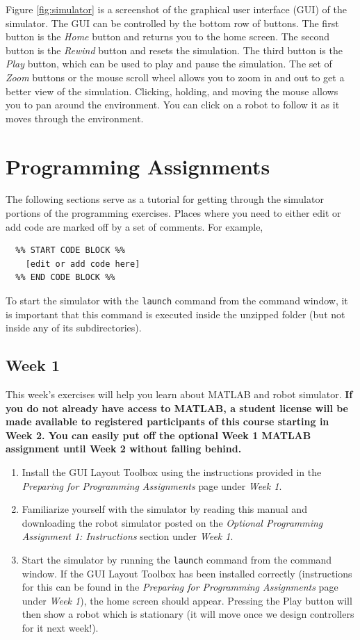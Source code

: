 \documentclass[10pt]{article}
\begin{document}
Figure \ref{fig:simulator} is a screenshot of the graphical user interface (GUI) of the simulator. The GUI can be controlled by the bottom row of buttons. The first button is the \textit{Home} button and returns you to the home screen. The second button is the \textit{Rewind} button and resets the simulation. The third button is the \textit{Play} button, which can be used to play and pause the simulation. The set of \textit{Zoom} buttons or the mouse scroll wheel allows you to zoom in and out to get a better view of the simulation. Clicking, holding, and moving the mouse allows you to pan around the environment. You can click on a robot to follow it as it moves through the environment.

\newpage
\section{Programming Assignments}

The following sections serve as a tutorial for getting through the simulator portions of the programming exercises. Places where you need to either edit or add code are marked off by a set of comments. For example,

\begin{verbatim}
  %% START CODE BLOCK %%
    [edit or add code here]
  %% END CODE BLOCK %%
\end{verbatim}

To start the simulator with the \texttt{launch} command from the command window, it is important that this command is executed inside the unzipped folder (but not inside any of its subdirectories).

\subsection{Week 1}

This week's exercises will help you learn about MATLAB and robot simulator. \textbf{If you do not already have access to MATLAB, a student license will be made available to registered participants of this course starting in Week 2. You can easily put off the optional Week 1 MATLAB assignment until Week 2 without falling behind.} 

\begin{enumerate}
\item Install the GUI Layout Toolbox using the instructions provided in the \emph{Preparing for Programming Assignments} page under \emph{Week 1}. 
\item Familiarize yourself with the simulator by reading this manual and downloading the robot simulator posted on the \textit{Optional Programming Assignment 1: Instructions} section under \emph{Week 1}.
\item Start the simulator by running the \texttt{launch} command from the command window. If the GUI Layout Toolbox has been installed correctly (instructions for this can be found in the \emph{Preparing for Programming Assignments} page under \emph{Week 1}), the home screen should appear. Pressing the Play button will then show a robot which is stationary (it will move once we design controllers for it next week!). 
\end{enumerate}
\end{document}
